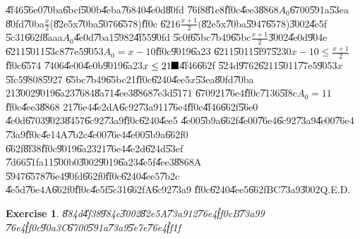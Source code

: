\documentclass{article}
\newtheorem{exercise}[theorem]{Exercise}
\begin{document}
\bigskip 

\U{4f46}\U{56e0}\U{70ba}\U{6bcf}\U{500b}\U{4eba}\U{7684}0\U{4e0d}\U{80fd}%
\U{76f8}\U{81e8}\U{ff0c}\U{4ee3}\U{8868}$A_{0}$\U{6700}\U{591a}\U{53ea}%
\U{80fd}\U{70ba}$\frac{x}{2}$(\U{82e5}x\U{70ba}\U{5076}\U{6578})\U{ff0c}%
\U{6216}$\frac{x+1}{2}($\U{82e5}x\U{70ba}\U{5947}\U{6578})\U{3002}\U{4e5f}%
\U{5c31}\U{662f}\U{8aaa}$A_{0}$\U{4e0d}\U{7ba1}\U{5982}\U{4f55}\U{90fd}%
\U{5c0f}\U{65bc}\U{7b49}\U{65bc}$\frac{x+1}{2}$\U{3002}\U{4e0d}\U{904e}%
\U{6211}\U{5011}\U{53c8}\U{77e5}\U{9053}$A_{0}=x-10$\U{ff0c}\U{9019}\U{6a23}%
\U{6211}\U{5011}\U{5f97}\U{5230}$x-10\leq \frac{x+1}{2}$\U{ff0c}\U{6574}%
\U{7406}\U{4e00}\U{4e0b}\U{9019}\U{6a23}$x\leq 21\U{ff0c} $\U{4f46}\U{662f}%
\U{524d}\U{9762}\U{6211}\U{5011}\U{77e5}\U{9053}$x$\U{5fc5}\U{9808}\U{5927}%
\U{65bc}\U{7b49}\U{65bc}21\U{ff0c}\U{6240}\U{4ee5}$x$\U{53ea}\U{80fd}\U{70ba}%
21\U{3002}\U{9019}\U{6a23}\U{7684}\U{8a71}\U{4ee3}\U{8868}\U{7e3d}\U{5171}%
\U{6709}21\U{76e4}\U{ff0c}\U{7136}\U{5f8c}$A_{0}=11$\U{ff0c}\U{4ee3}\U{8868}%
21\U{76e4}\U{4e2d}A\U{6c92}\U{73a9}11\U{76e4}\U{ff0c}\U{4f46}\U{662f}\U{56e0}%
\U{4e0d}\U{6703}\U{9023}\U{8457}\U{6c92}\U{73a9}\U{ff0c}\U{6240}\U{4ee5}%
\U{4e00}\U{5b9a}\U{662f}\U{4e00}\U{76e4}\U{6c92}\U{73a9}\U{4e00}\U{76e4}%
\U{73a9}\U{ff0c}\U{4e14}A\U{7b2c}\U{4e00}\U{76e4}\U{4e00}\U{5b9a}\U{662f}0%
\U{662f}\U{8f38}\U{ff0c}\U{9019}\U{6a23}21\U{76e4}\U{4e2d}\U{624d}\U{53ef}%
\U{7d66}\U{51fa}11\U{500b}0\U{3002}\U{9019}\U{6a23}\U{4e5f}\U{4ee3}\U{8868}A%
\U{5947}\U{6578}\U{76e4}\U{90fd}\U{662f}0\U{ff0c}\U{6240}\U{4ee5}\U{7b2c}%
\U{4e5d}\U{76e4}A\U{662f}0\U{ff0c}\U{4e5f}\U{5c31}\U{662f}A\U{6c92}\U{73a9}%
\U{ff0c}\U{6240}\U{4ee5}\U{662f}BC\U{73a9}\U{3002}Q.E.D.

\bigskip

\begin{exercise}
\U{884d}\U{4f38}\U{984c}\U{3002}\U{82e5}A\U{73a9}12\U{76e4}\U{ff0c}B\U{73a9}9%
\U{76e4}\U{ff0c}\U{90a3}C\U{6700}\U{591a}\U{73a9}\U{5e7e}\U{76e4}\U{ff1f}
\end{exercise}
\end{document}
